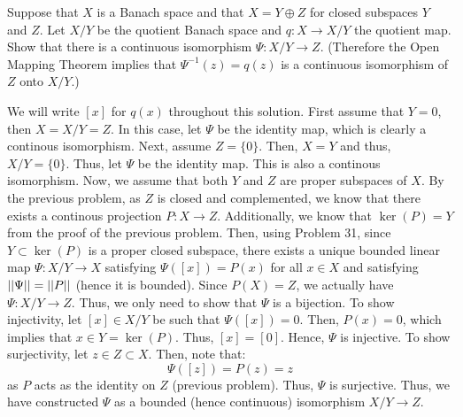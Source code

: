 \documentclass[12pt]{article}
\begin{document}
\begin{problem}{3}
    Suppose that $X$ is a Banach space and that $X = Y \oplus Z$ for closed subspaces $Y$ and $Z$. Let $X/Y$ be the quotient Banach space and $q : X \to X/Y$ the quotient map. Show that there is a continuous isomorphism $\Psi : X/Y \to Z$. (Therefore the Open Mapping Theorem implies that $\Psi^{-1}(z) = q(z)$ is a continuous isomorphism of $Z$ onto $X/Y$.)
\end{problem}
\begin{solution}
    We will write $[x]$ for $q(x)$ throughout this solution. \bbni
    First assume that $Y = 0$, then $X = X/Y = Z$. In this case, let $\Psi$ be the identity map, which is clearly a continous isomorphism. Next, assume $Z = \{0\}$. Then, $X = Y$ and thus, $X/Y = \{0\}$. Thus, let $\Psi$ be the identity map. This is also a continous isomorphism. \bbni
    Now, we assume that both $Y$ and $Z$ are proper subspaces of $X$. By the previous problem, as $Z$ is closed and complemented, we know that there exists a continous projection $P: X \to Z$. Additionally, we know that $\ker(P) = Y$ from the proof of the previous problem. \bbni
    Then, using Problem 31, since $Y \subset \ker(P)$ is a proper closed subspace, there exists a unique bounded linear map $\Psi: X/Y \to X$ satisfying $\Psi([x]) = P(x)$ for all $x \in X$ and satisfying $\left\vert\left\vert\Psi\right\vert\right\vert = \left\vert\left\vert P\right\vert\right\vert$ (hence it is bounded). Since $P(X) = Z$, we actually have $\Psi: X/Y \to Z$. Thus, we only need to show that $\Psi$ is a bijection. \bbni
    To show injectivity, let $[x]\in X/Y$ be such that $\Psi([x]) = 0$. Then, $P(x) = 0$, which implies that $x \in Y = \ker(P)$. Thus, $[x] = [0]$. Hence, $\Psi$ is injective. \bbni
    To show surjectivity, let $z \in Z \subset X$. Then, note that: 
    \[ \Psi([z]) = P(z) = z\]
    as $P$ acts as the identity on $Z$ (previous problem). Thus, $\Psi$ is surjective. \bbni
    Thus, we have constructed $\Psi$ as a bounded (hence continuous) isomorphism $X/Y \to Z$.
\end{solution}
\newpage
\end{document}
